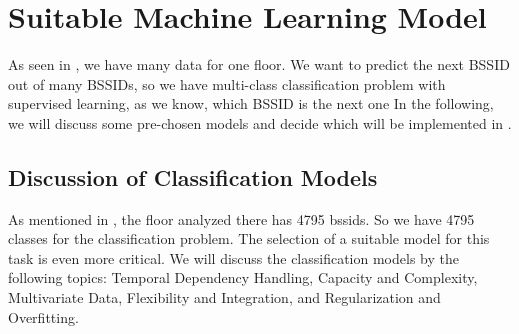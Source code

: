 \chapter{Suitable Machine Learning Model}\label{ch:discuss-ml}


As seen in , we have many data for one floor. 
We want to predict the next BSSID out of many BSSIDs, so we have multi-class classification problem with supervised learning, as we know, which BSSID is the next one
In the following, we will discuss some pre-chosen models and decide which will be implemented in .


\section{Discussion of Classification Models}
As mentioned in , the floor analyzed there has 4795 \acp{bssid}.
So we have 4795 classes for the classification problem.
The selection of a suitable model for this task is even more critical.
We will discuss the classification models by the following topics: Temporal Dependency Handling, Capacity and Complexity, Multivariate Data, Flexibility and Integration, and Regularization and Overfitting. \\

